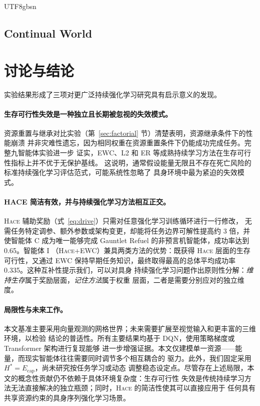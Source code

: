 \documentclass[sigplan,10pt]{acmart}
\newcommand{\setpoint}{H^*}
\newcommand{\energy}{E}
\newcommand{\hace}{\textsc{Hace}}
\begin{document}
\begin{CJK*}{UTF8}{gbsn}
\subsection{Continual World}
\label{sec:cw}


\section{讨论与结论}
\label{sec:discussion}

实验结果形成了三项对更广泛持续强化学习研究具有启示意义的发现。

\paragraph{生存可行性失效是一种独立且长期被忽视的失效模式。}
资源重置与继承对比实验（第~\ref{sec:factorial} 节）清楚表明，资源继承条件下的性能崩溃
并非灾难性遗忘，因为相同权重在资源重置条件下仍能成功完成任务。完整九智能体实验进一步
证实，EWC、L2 和 ER 等成熟持续学习方法在生存可行性指标上并不优于无保护基线。
这说明，通常假设能量无限且不存在死亡风险的标准持续强化学习评估范式，可能系统性忽略了
具身环境中最为紧迫的失效模式。

\paragraph{HACE 简洁有效，并与持续强化学习方法相互正交。}
\hace{} 辅助奖励（式~\ref{eq:drive}）只需对任意强化学习训练循环进行一行修改，
无需任务特定调参、额外参数或架构变更，却能将任务边界可解性提高约 3 倍，并使智能体 C
成为唯一能够完成 Gauntlet Refuel 的非预言机智能体，成功率达到 0.65。智能体 I
（\hace{}+EWC）兼具两类方法的优势：既获得 \hace{} 层面的生存可行性，又通过 EWC
保持早期任务知识，最终取得最高的总体平均成功率 0.335。这种互补性提示我们，可以对具身
持续强化学习问题作出原则性分解：\emph{维持生存}属于奖励层面，\emph{记住方法}属于权重
层面，二者是需要分别应对的独立维度。

\paragraph{局限性与未来工作。}
本文基准主要采用向量观测的网格世界；未来需要扩展至视觉输入和更丰富的三维环境，以检验
结论的普适性。所有主要结果均基于 DQN，使用策略梯度或 Transformer 架构进行复现能够
进一步增强证据。本文仅建模单一资源——能量，而现实智能体往往需要同时调节多个相互耦合的
驱力。此外，我们固定采用 $\setpoint = \energy_{\text{cap}}$，尚未研究按任务学习或动态
调整稳态设定点。尽管存在上述局限，本文的概念性贡献仍不依赖于具体环境复杂度：生存可行性
失效是传统持续学习方法无法直接解决的独立瓶颈；同时，\hace{} 的简洁性使其可以直接应用于
任何具有共享资源约束的具身序列强化学习场景。



\end{CJK*}
\end{document}
